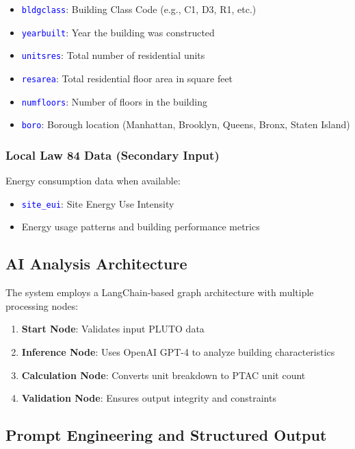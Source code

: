 \documentclass{article}
\newcommand{\code}[1]{\textcolor{blue}{\texttt{#1}}}
\begin{document}
\begin{itemize}
    \item \code{bldgclass}: Building Class Code (e.g., C1, D3, R1, etc.)
    \item \code{yearbuilt}: Year the building was constructed 
    \item \code{unitsres}: Total number of residential units
    \item \code{resarea}: Total residential floor area in square feet
    \item \code{numfloors}: Number of floors in the building
    \item \code{boro}: Borough location (Manhattan, Brooklyn, Queens, Bronx, Staten Island)
\end{itemize}

\subsubsection{Local Law 84 Data (Secondary Input)}

Energy consumption data when available:
\begin{itemize}
    \item \code{site\_eui}: Site Energy Use Intensity
    \item Energy usage patterns and building performance metrics
\end{itemize}

\subsection{AI Analysis Architecture}

The system employs a LangChain-based graph architecture with multiple processing nodes:

\begin{enumerate}
    \item \textbf{Start Node}: Validates input PLUTO data
    \item \textbf{Inference Node}: Uses OpenAI GPT-4 to analyze building characteristics
    \item \textbf{Calculation Node}: Converts unit breakdown to PTAC unit count
    \item \textbf{Validation Node}: Ensures output integrity and constraints
\end{enumerate}

\subsection{Prompt Engineering and Structured Output}
\end{document}

